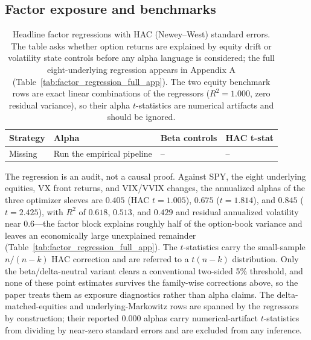 \subsection{Factor exposure and benchmarks}

\begin{table}[H]
\centering
\scriptsize
{}
  {\resizebox{\textwidth}{!}{}}
  {\begin{tabular}{llll}\toprule Strategy & Alpha & Beta controls & HAC t-stat \\\midrule
  Missing & Run the empirical pipeline & -- & -- \\\bottomrule\end{tabular}}
\caption{Headline factor regressions with HAC (Newey--West) standard errors. The table
asks whether option returns are explained by equity drift or volatility state controls
before any alpha language is considered; the full eight-underlying regression appears in
Appendix A (Table~\ref{tab:factor_regression_full_app}). The two equity benchmark rows are
exact linear combinations of the regressors (\(R^2=1.000\), zero residual variance), so
their alpha \(t\)-statistics are numerical artifacts and should be ignored.}
\label{tab:factor_regression}
\end{table}

The regression is an audit, not a causal proof. Against SPY, the eight underlying
equities, VX front returns, and VIX/VVIX changes, the annualized alphas of the three
optimizer sleeves are \(0.405\) (HAC \(t=1.005\)), \(0.675\) (\(t=1.814\)), and \(0.845\)
(\(t=2.425\)), with \(R^2\) of \(0.618\), \(0.513\), and \(0.429\) and residual annualized
volatility near \(0.6\)---the factor block explains roughly half of the option-book
variance and leaves an economically large unexplained remainder
(Table~\ref{tab:factor_regression_full_app}). The \(t\)-statistics carry the
small-sample \(n/(n-k)\) HAC correction and are referred to a \(t(n-k)\) distribution.
Only the beta/delta-neutral variant clears
a conventional two-sided 5\% threshold, and none of these point estimates survives the
family-wise corrections above, so the paper treats them as exposure diagnostics rather
than alpha claims. The delta-matched-equities and underlying-Markowitz rows are spanned by
the regressors by construction; their reported \(0.000\) alphas carry numerical-artifact
\(t\)-statistics from dividing by near-zero standard errors and are excluded from any
inference.

